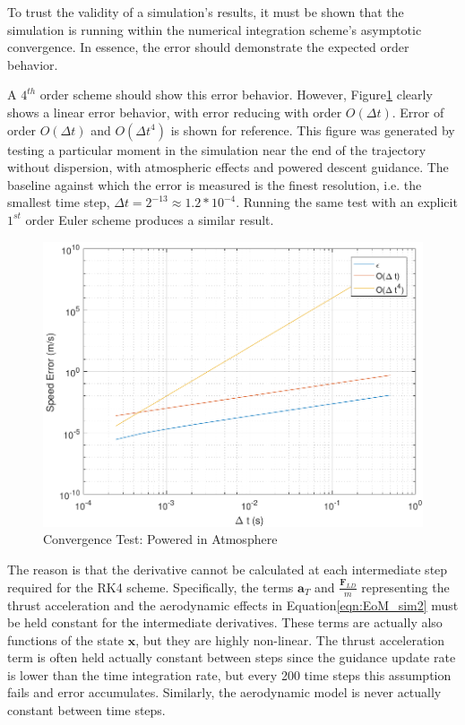 To trust the validity of a simulation's results, it must be shown that the simulation is running within the numerical integration scheme's asymptotic convergence. In essence, the error should demonstrate the expected order behavior. 


A $4^{th}$ order scheme should show this error behavior. However, Figure\:\ref{fig:convtestatmo} clearly shows a linear error behavior, with error reducing with order $O(\Delta t)$. Error of order $O(\Delta t)$ and $O(\Delta t ^4)$ is shown for reference. This figure was generated by testing a particular moment in the simulation near the end of the trajectory without dispersion, with atmospheric effects and powered descent guidance. The baseline against which the error is measured is the finest resolution, i.e. the smallest time step, $\Delta t = 2^{-13} \approx 1.2*10^{-4}$. Running the same test with an explicit $1^{st}$ order Euler scheme produces a similar result. 
\begin{figure}[H]
	\centering
	\begin{minipage}{4.5 in}
		\includegraphics[width=\linewidth]{Figures/convtestatmo.pdf}
		\caption{Convergence Test: Powered in Atmosphere \label{fig:convtestatmo} }
	\end{minipage}
\end{figure}


The reason is that the derivative cannot be calculated at each intermediate step required for the RK4 scheme. Specifically, the terms $\bm{a}_T$ and $\frac{\bm{F}_{LD}}{m}$ representing the thrust acceleration and the aerodynamic effects in Equation\:\ref{eqn:EoM_sim2} must be held constant for the intermediate derivatives. These terms are actually also functions of the state $\bm{x}$, but they are highly non-linear. The thrust acceleration term is often held actually constant between steps since the guidance update rate is lower than the time integration rate, but every 200 time steps this assumption fails and error accumulates. Similarly, the aerodynamic model is never actually constant between time steps.


